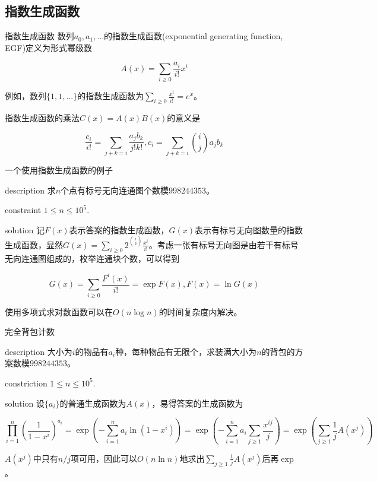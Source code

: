 \documentclass{beamer}
\begin{document}
	\subsection{指数生成函数}
	\begin{frame}{指数生成函数}
		数列$a_0,a_1,...$的指数生成函数(exponential generating function, EGF)定义为形式幂级数

		$$A(x)=\sum_{i\ge 0}\frac{a_i}{i!}x^i$$
		
		例如，数列$\{1,1,...\}$的指数生成函数为$\sum_{i\ge 0}\frac{x^i}{i!}=e^x$。
		
		指数生成函数的乘法$C(x)=A(x)B(x)$的意义是
		
		$$\frac{c_i}{i!}=\sum_{j+k=i}\frac{a_jb_k}{j!k!},c_i=\sum_{j+k=i}\binom{i}{j}a_jb_k$$
	\end{frame}
	\begin{frame}{一个使用指数生成函数的例子}
		\begin{block}{description}
			求$n$个点有标号无向连通图个数模$998244353$。
		\end{block}
		\begin{block}{constraint}
			$1 \le n \le 10^5.$
		\end{block}
		\pause
		\begin{block}{solution}
			记$F(x)$表示答案的指数生成函数，$G(x)$表示有标号无向图数量的指数生成函数，显然$G(x)=\sum_{i\ge 0}2^{\binom i2}\frac{x^i}{i!}$。考虑一张有标号无向图是由若干有标号无向连通图组成的，枚举连通块个数，可以得到
			
			$$G(x)=\sum_{i \ge 0}\frac{F^i(x)}{i!}=\exp F(x),F(x)=\ln G(x)$$
			
			使用多项式求对数函数可以在$O(n\log n)$的时间复杂度内解决。
		\end{block}
	\end{frame}
	\begin{frame}{完全背包计数}
		\begin{block}{description}
			大小为$i$的物品有$a_i$种，每种物品有无限个，求装满大小为$n$的背包的方案数模$998244353$。
		\end{block}
		\begin{block}{constriction}
			$1 \le n \le 10^5.$
		\end{block}
		\pause
		\begin{block}{solution}
			设$\{a_i\}$的普通生成函数为$A(x)$，易得答案的生成函数为
			
			$$\prod_{i=1}^n(\frac{1}{1-x^i})^{a_i}=\exp(-\sum_{i=1}^na_i\ln(1-x^i))=\exp(-\sum_{i=1}^na_i\sum_{j\ge 1}\frac{x^{ij}}{j})=\exp(\sum_{j\ge 1}\frac{1}{j}A(x^j))$$
			
			$A(x^j)$中只有$n/j$项可用，因此可以$O(n\ln n)$地求出$\sum_{j\ge 1}\frac{1}{j}A(x^j)$后再$\exp$。
		\end{block}
	\end{frame}
\end{document}

